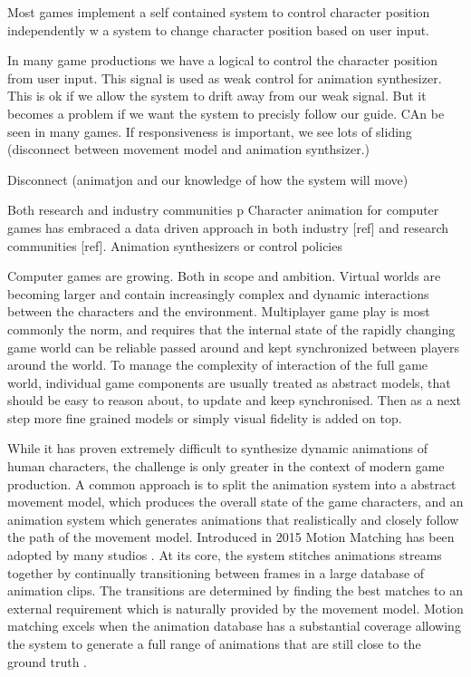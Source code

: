 Most games implement a self contained system to control character position independently 
w a system to change character position based on user input. 

In many game productions we have a logical to control the character position from user input. This signal is used as weak control for animation synthesizer. This is ok if we allow the system to drift away from our weak signal. But it becomes a problem if we want the system to precisly follow our guide. CAn be seen in many games. If responsiveness is important, we see lots of sliding (disconnect between movement model and animation synthsizer.)


Disconnect (animatjon and our knowledge of how the system will move)






Both research and industry communities p
Character animation for computer games has embraced a data driven approach in both industry [ref] and research communities [ref]. Animation synthesizers or control policies  



Computer games are growing. Both in scope and ambition. Virtual worlds are becoming larger and contain increasingly complex and dynamic interactions between the characters and the environment. Multiplayer game play is most commonly the norm, and requires that the internal state of the rapidly changing game world can be reliable passed around and kept synchronized between players around the world. To manage the complexity of interaction of the full game world, individual game components are usually treated as abstract models, that should be easy to reason about, to update and keep synchronised. Then as a next step more fine grained models or simply visual fidelity is added on top. 

While it has proven extremely difficult to synthesize dynamic animations of human characters, the challenge is only greater in the context of modern game production. A common approach is to split the animation system into a abstract movement model, which produces the overall state of the game characters, and an animation system which generates animations that realistically and closely follow the path of the movement model. Introduced in 2015 Motion Matching has been adopted by many studios . At its core, the system stitches animations streams together by continually transitioning between frames in a large database of animation clips. The transitions are determined by finding the best matches to an external requirement which is naturally provided by the movement model. Motion matching excels when the animation database has a substantial coverage allowing the system to generate a full range of animations that are still close to the ground truth . 

